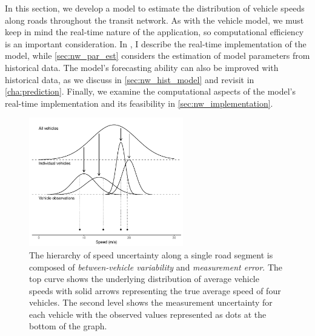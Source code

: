 In this section, we develop a model to estimate the distribution of vehicle speeds along roads throughout the transit network. As with the vehicle model, we must keep in mind the real-time nature of the application, so computational efficiency is an important consideration. In , I describe the real-time implementation of the model, while \cref{sec:nw_par_est} considers the estimation of model parameters from historical data. The model's forecasting ability can also be improved with historical data, as we discuss in \cref{sec:nw_hist_model} and revisit in \cref{cha:prediction}. Finally, we examine the computational aspects of the model's real-time implementation and its feasibility in \cref{sec:nw_implementation}.


\begin{knitrout}\small
{}\color{fgcolor}\begin{figure}

{\centering \includegraphics[width=0.6\textwidth]{figure/nw_model_hierarchy-1} 

}

\caption[The hierarchy of speed uncertainty along a single road segment]{The hierarchy of speed uncertainty along a single road segment is composed of \emph{between-vehicle variability} and \emph{measurement error}. The top curve shows the underlying distribution of average vehicle speeds with solid arrows representing the true average speed of four vehicles. The second level shows the measurement uncertainty for each vehicle with the observed values represented as dots at the bottom of the graph.}\label{fig:nw_model_hierarchy}
\end{figure}


\end{knitrout}






